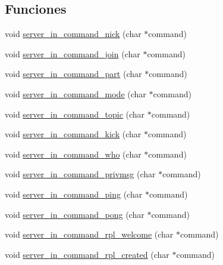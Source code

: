 \subsection*{Funciones}
\begin{DoxyCompactItemize}
\item 
void \hyperlink{G-2313-06-P2__client__function__handlers_8h_a3271de16b2f7077059343bd6f52e4866}{server\+\_\+in\+\_\+command\+\_\+nick} (char $\ast$command)
\item 
void \hyperlink{G-2313-06-P2__client__function__handlers_8h_a64c324e32edf01774722861d3abc7be3}{server\+\_\+in\+\_\+command\+\_\+join} (char $\ast$command)
\item 
void \hyperlink{G-2313-06-P2__client__function__handlers_8h_a53568ffb9d2301140815861c2f7178ad}{server\+\_\+in\+\_\+command\+\_\+part} (char $\ast$command)
\item 
void \hyperlink{G-2313-06-P2__client__function__handlers_8h_ae5f66619469f8ea0efa0a7a5d75938dc}{server\+\_\+in\+\_\+command\+\_\+mode} (char $\ast$command)
\item 
void \hyperlink{G-2313-06-P2__client__function__handlers_8h_ad908abfd32d53b9483d5afa4ca18ff14}{server\+\_\+in\+\_\+command\+\_\+topic} (char $\ast$command)
\item 
void \hyperlink{G-2313-06-P2__client__function__handlers_8h_aa3d18c616914957b9794f086466788bb}{server\+\_\+in\+\_\+command\+\_\+kick} (char $\ast$command)
\item 
void \hyperlink{G-2313-06-P2__client__function__handlers_8h_a858c0e5586286e535590f7de14620300}{server\+\_\+in\+\_\+command\+\_\+who} (char $\ast$command)
\item 
void \hyperlink{G-2313-06-P2__client__function__handlers_8h_a32594eebe5482f63993568825a9e126a}{server\+\_\+in\+\_\+command\+\_\+privmsg} (char $\ast$command)
\item 
void \hyperlink{G-2313-06-P2__client__function__handlers_8h_a09a9d4d13037bd783036a70d5a76ac46}{server\+\_\+in\+\_\+command\+\_\+ping} (char $\ast$command)
\item 
void \hyperlink{G-2313-06-P2__client__function__handlers_8h_a06042a6459e89e0ae7586e66f8595fa3}{server\+\_\+in\+\_\+command\+\_\+pong} (char $\ast$command)
\item 
void \hyperlink{G-2313-06-P2__client__function__handlers_8h_a294ef5e5070e9859d88beb603ef950f2}{server\+\_\+in\+\_\+command\+\_\+rpl\+\_\+welcome} (char $\ast$command)
\item 
void \hyperlink{G-2313-06-P2__client__function__handlers_8h_a40e46db4017fb76fc547536d9c51f5d9}{server\+\_\+in\+\_\+command\+\_\+rpl\+\_\+created} (char $\ast$command)

\end{DoxyCompactItemize}
